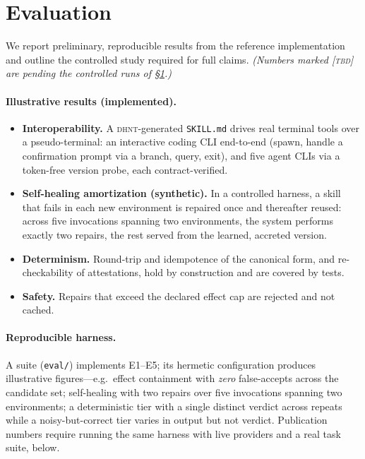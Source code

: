 \documentclass[11pt]{article}
\newcommand{\dhnt}{\textsc{dhnt}}
\begin{document}
\section{Evaluation}\label{sec:eval}

We report preliminary, reproducible results from the reference implementation and
outline the controlled study required for full claims. \emph{(Numbers marked
\textsc{[tbd]} are pending the controlled runs of \S\ref{sec:eval}.)}

\paragraph{Illustrative results (implemented).}
\begin{itemize}[topsep=2pt,itemsep=1pt]
\item \textbf{Interoperability.} A \dhnt{}-generated \texttt{SKILL.md} drives
real terminal tools over a pseudo-terminal: an interactive coding CLI end-to-end
(spawn, handle a confirmation prompt via a branch, query, exit), and five agent
CLIs via a token-free version probe, each contract-verified.
\item \textbf{Self-healing amortization (synthetic).} In a controlled harness, a
skill that fails in each new environment is repaired once and thereafter reused:
across five invocations spanning two environments, the system performs exactly
two repairs, the rest served from the learned, accreted version.
\item \textbf{Determinism.} Round-trip and idempotence of the canonical form, and
re-checkability of attestations, hold by construction and are covered by tests.
\item \textbf{Safety.} Repairs that exceed the declared effect cap are rejected
and not cached.
\end{itemize}

\paragraph{Reproducible harness.} A suite (\texttt{eval/}) implements E1--E5; its
hermetic configuration produces illustrative figures---e.g.\ effect containment
with \emph{zero} false-accepts across the candidate set; self-healing with two
repairs over five invocations spanning two environments; a deterministic tier
with a single distinct verdict across repeats while a noisy-but-correct tier
varies in output but not verdict. Publication numbers require running the same
harness with live providers and a real task suite, below.
\end{document}
